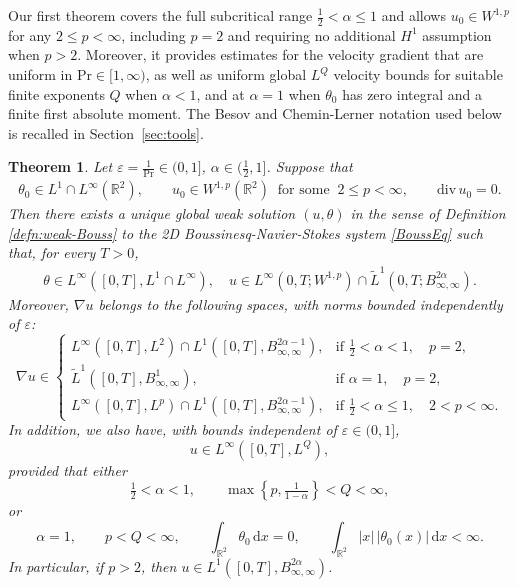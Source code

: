 \documentclass[reqno,11pt,a4paper]{amsart}
\newtheorem{theorem}{Theorem}[section]
\newcommand{\dd}{\mathrm{d}}
\begin{document}
Our first theorem covers the full subcritical range
$\frac12<\alpha\leq1$ and allows
$u_0\in W^{1,p}$ for any $2\leq p<\infty$,
including $p=2$ and requiring no additional $H^1$
assumption when $p>2$.
Moreover, it provides estimates for the velocity gradient
that are uniform in $\mathrm{Pr}\in[1,\infty)$,
as well as uniform global $L^Q$ velocity bounds
for suitable finite exponents $Q$ when $\alpha<1$,
and at $\alpha=1$ when $\theta_0$ has zero integral
and a finite first absolute moment.
The Besov and Chemin-Lerner notation used below
is recalled in Section~\ref{sec:tools}.
\begin{theorem}\label{thm:main1}
Let $\varepsilon =\frac{1}{\mathrm{Pr}} \in (0,1]$, $\alpha\in (\frac{1}{2},1]$.
Suppose that 
\begin{align*}
  \theta_0\in L^1\cap L^\infty(\mathbb{R}^2),\qquad u_0\in W^{1,p}(\mathbb{R}^2)\;\; \textrm{for some}
  \;\;2\leq p<\infty,\qquad \mathrm{div}\,u_0=0.
\end{align*}
Then there exists a unique global weak solution $(u,\theta)$ in the sense of Definition \ref{defn:weak-Bouss} 
to the 2D Boussinesq-Navier-Stokes system \eqref{BoussEq} 
such that, for every $T>0$,
\begin{align*}
  \theta\in L^\infty([0,T],L^1\cap L^\infty),\quad u\in L^\infty (0,T;W^{1,p})\cap \widetilde{L}^1(0,T;B^{2\alpha}_{\infty,\infty}).
\end{align*}
Moreover, $\nabla u$ belongs to the following spaces,
with norms bounded independently of $\varepsilon$:
\[
\nabla u\in
\begin{cases}
  L^\infty([0,T],L^2)
  \cap L^1([0,T],B^{2\alpha-1}_{\infty,\infty}),
  & \text{if }\frac12<\alpha<1,\quad p=2,\\
  \widetilde L^1([0,T],B^1_{\infty,\infty}),
  & \text{if }\alpha=1,\quad p=2,\\
  L^\infty([0,T],L^p)
  \cap L^1([0,T],B^{2\alpha-1}_{\infty,\infty}),
  & \text{if }\frac12<\alpha\leq1,\quad 2<p<\infty.
\end{cases}
\]
In addition, we also have, with bounds independent of
$\varepsilon\in(0,1]$,
\begin{equation}\label{eq:u-in-LQ-unif}
  u\in L^\infty([0,T],L^Q),
\end{equation}
provided that either
\[
  \tfrac12<\alpha<1,
  \qquad
  \max\left\{p,\tfrac1{1-\alpha}\right\}<Q<\infty,
\]
or
\[
  \alpha=1,\qquad p<Q<\infty,\qquad
  \int_{\mathbb R^2}\theta_0\,\dd x=0,\qquad
  \int_{\mathbb R^2}|x|\,|\theta_0(x)|\,\dd x<\infty.
\]
In particular, if $p>2$, then $u\in L^1([0,T],B^{2\alpha}_{\infty,\infty})$.
\end{theorem}
\end{document}
